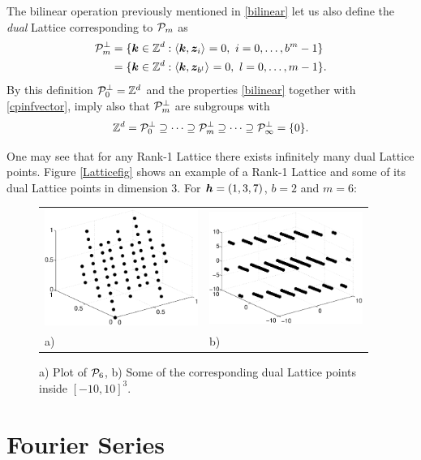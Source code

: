 \documentclass[graybox]{svmult}
\newcommand{\Z}{\mathbb{Z}} %
\newcommand{\bsz}{\boldsymbol{z}}    %
\begin{document}
The bilinear operation previously mentioned in \eqref{bilinear} let us also define the \emph{dual} Lattice corresponding to $\mathcal{P}_m$ as
\begin{align}
\nonumber
\cp^{\perp}_m &= \{\bsk \in \Z^d : \ip{\bsk}{\bsz_i} = 0, \ i=0, \ldots, b^m-1\} \\
&= \{\bsk \in \Z^d : \ip{\bsk}{\bsz_{b^{l}}} = 0, \ l=0, \ldots, m-1\}.\label{dualdef}
\end{align}
By this definition $\cp^{\perp}_{0}=\Z^d$ and the properties \eqref{bilinear} together with \eqref{cpinfvector}, imply also that $\mathcal{P}^{\perp}_m$ are subgroups with
\begin{equation}\label{dualemb}
\Z^d=\cp^{\perp}_{0}\supseteq\dots\supseteq\cp^{\perp}_{m}\supseteq\dots\supseteq\cp^{\perp}_{\infty}=\{0\}.
\end{equation}

One may see that for any Rank-1 Lattice there exists infinitely many dual Lattice points. Figure \eqref{Latticefig} shows an example of a Rank-1 Lattice and some of its dual Lattice points in dimension 3. For $\boldsymbol{h}=(1,3,7)$, $b=2$ and $m=6$:
\begin{figure}[h!]
\centering
\begin{tabular}{>{\centering}p{5cm}>{\centering}p{5cm}}
\includegraphics[width=5cm]{Images/Lattice64.eps} &
\includegraphics[width=5cm]{Images/DualLattice64.eps}\tabularnewline
a) & b)
\end{tabular}
\caption{a) Plot of $\mathcal{P}_6$, b) Some of the corresponding dual Lattice points inside $[-10,10]^3$.}\label{Latticefig}
\end{figure}

\section{Fourier Series}\label{secfourierseries}
\end{document}
